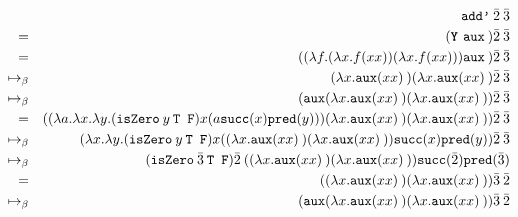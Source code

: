 \documentclass[11pt]{article}
\begin{document}
\begin{enumerate}
	      \begin{align*}
		                    &  & \texttt{add'} \: \bar{2} \: \bar{3}                                                                                                                                                                             & \\
		      =             &  & (\textbf{\texttt{Y} } \texttt{aux} \: ) \bar{2} \: \bar{3}                                                                                                                                                      & \\
		      =             &  & (( \lambda f. ( \lambda x. f(xx))( \lambda x. f(xx))) \texttt{aux} \: ) \bar{2} \: \bar{3}                                                                                                                      & \\
		      \mapsto_\beta &  & ( \lambda x. \texttt{aux}(x x) \:)( \lambda x. \texttt{aux}(x x) \:) \bar{2} \: \bar{3}                                                                                                                         & \\
		      \mapsto_\beta &  & (\texttt{aux}( \lambda x. \texttt{aux}(x x) \:)( \lambda x. \texttt{aux}(x x) \:)) \bar{2} \: \bar{3}                                                                                                           & \\
		      =             &  & (( \lambda a. \lambda x. \lambda y. ( \texttt{isZero} \: y \: \texttt{T F}) x ( a \texttt{succ}(x) \texttt{pred}(y)))( \lambda x. \texttt{aux}(x x) \:)( \lambda x. \texttt{aux}(x x) \:)) \bar{2} \: \bar{3}   & \\
		      \mapsto_\beta &  & ( \lambda x. \lambda y. ( \texttt{isZero} \: y \: \texttt{T F}) x (( \lambda x. \texttt{aux}(x x) \:)( \lambda x. \texttt{aux}(x x) \:)) \texttt{succ}(x) \texttt{pred}(y)) \bar{2} \: \bar{3}                  & \\
		      \mapsto_\beta &  & ( \texttt{isZero} \: \bar{3} \: \texttt{T F}) \bar{2} \: (( \lambda x. \texttt{aux}(x x) \:)( \lambda x. \texttt{aux}(x x) \:)) \texttt{succ}( \bar{2} ) \texttt{pred}( \bar{3} )                               & \\
		      =             &  & (( \lambda x. \texttt{aux}(x x) \:)( \lambda x. \texttt{aux}(x x) \:)) \bar{3} \: \bar{2}                                                                                                                       & \\
		      \mapsto_\beta &  & ( \texttt{aux}( \lambda x. \texttt{aux}(x x) \:)( \lambda x. \texttt{aux}(x x) \:)) \bar{3} \: \bar{2}                                                                                                          & \\

\end{align*}
\end{enumerate}
\end{document}
